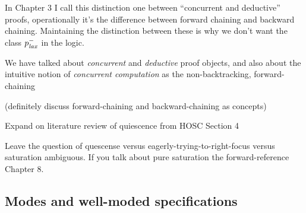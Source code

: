 In Chapter 3 I call this distinction one between ``concurrent and deductive''
proofs, operationally it's the difference between forward chaining 
and backward chaining. Maintaining the distinction between these is why
we don't want the class $p^-_{\it lax}$ in the logic.

We have talked about {\it concurrent} and {\it deductive} proof
objects, and also about the intuitive notion of {\it concurrent
  computation} as the non-backtracking, forward-chaining 

(definitely discuss forward-chaining and backward-chaining as concepts)

Expand on literature review of quiescence from HOSC Section 4

Leave the question of quescense versus eagerly-trying-to-right-focus
versus saturation ambiguous. If you talk about pure saturation the
forward-reference Chapter 8. 

\subsection{Modes and well-moded specifications}
\label{sec:framework-modes}

